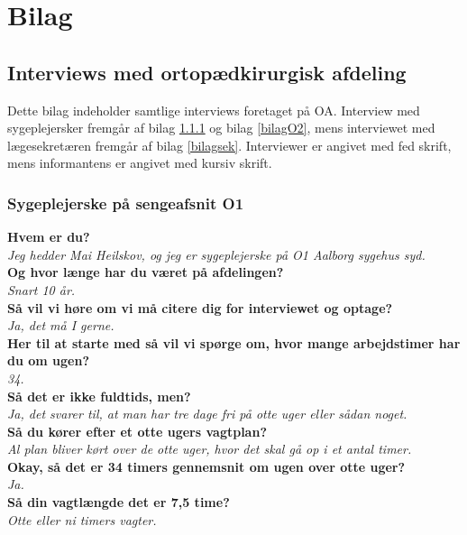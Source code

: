 \chapter{Bilag}

\section{Interviews med ortopædkirurgisk afdeling}
Dette bilag indeholder samtlige interviews foretaget på OA. Interview med sygeplejersker fremgår af bilag \ref{bilagO1} og bilag \ref{bilagO2}, mens interviewet med lægesekretæren fremgår af bilag \ref{bilagsek}. Interviewer er angivet med fed skrift, mens informantens er angivet med kursiv skrift. 

\subsection{Sygeplejerske på sengeafsnit O1} \label{bilagO1}
\textbf{Hvem er du?} \\
\noindent
\textit{Jeg hedder Mai Heilskov, og jeg er sygeplejerske på O1 Aalborg sygehus syd. } \\
\noindent
\textbf{Og hvor længe har du været på afdelingen?}\\
\noindent
\textit{Snart 10 år.} \\
\noindent
\textbf{Så vil vi høre om vi må citere dig for interviewet og optage?}\\
\noindent
\textit{ Ja, det må I gerne.}\\
\noindent
\textbf{Her til at starte med så vil vi spørge om, hvor mange arbejdstimer har du om ugen?} \\
\noindent
\textit{34.} \\
\noindent
\textbf{Så det er ikke fuldtids, men?} \\
\noindent
\textit{Ja, det svarer til, at man har tre dage fri på otte uger eller sådan noget.} \\
\noindent
\textbf{Så du kører efter et otte ugers vagtplan?} \\
\noindent
\textit{Al plan bliver kørt over de otte uger, hvor det skal gå op i et antal timer.} \\
\noindent
\textbf{Okay, så det er 34 timers gennemsnit om ugen over otte uger?} \\
\noindent
\textit{Ja.} \\
\noindent
\textbf{Så din vagtlængde det er 7,5 time?} \\
\noindent
\textit{Otte eller ni timers vagter.} \\
